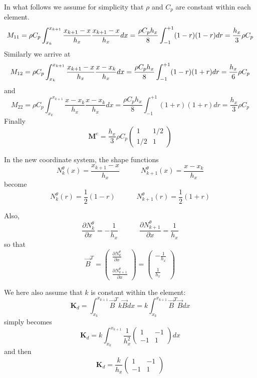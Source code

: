 In what follows we assume for simplicity that $\rho$ and $C_p$ are constant within each element.
\[
M_{11}=
\rho C_p
\int_{\tiny x_k}^{x_{k+1}} 
\frac{x_{k+1}-x}{h_x}  
\frac{x_{k+1}-x}{h_x}  
dx
=  \frac{\rho C_p h_x}{8} \int_{-1}^{+1} (1-r) (1-r)  dr  = \frac{h_x}{3} \rho C_p
\]
Similarly we arrive at 
\begin{eqnarray}
M_{12}
=\rho C_p 
\int_{x_k}^{x_{k+1}} 
\frac{x_{k+1}-x}{h_x}  
\frac{x-x_k}{h_x}  
dx
=
\frac{\rho C_p  h_x}{8} 
\int_{-1}^{+1} (1-r) (1+r)dr
= \frac{h_x}{6} \rho C_p \nonumber
\end{eqnarray}
and 
\[
M_{22}
=
\rho C_p 
\int_{x_k}^{x_{k+1}} 
\frac{x-x_k}{h_x}  
\frac{x-x_k}{h_x}  
dx
=
\frac{\rho C_p  h_x}{8} 
\int_{-1}^{+1} (1+r) (1+r)dr
= \frac{h_x}{3} \rho C_p 
\]
Finally 
\[
\boxed{
{\bm M}^e= \frac{h_x}{3} \rho C_p  
\left(
\begin{array}{cc}
1  & 1/2 \\
1/2 & 1
\end{array}
\right)
}
\]

In the new coordinate system, the {\color{olive}shape functions} 
\[
N_k^\theta(x) = \frac{x_{k+1}-x}{h_x} 
\quad
\quad
\quad
N_{k+1}^\theta(x) = \frac{x-x_k}{h_x} 
\]
become 
\[
N_k^\theta(r) = \frac{1}{2} (1-r)
\quad
\quad
\quad
N_{k+1}^\theta(r) = \frac{1}{2} (1+r)
\]

Also, 
\[
\frac{\partial N_k^\theta}{\partial x} = - \frac{1}{h_x} 
\quad
\quad
\quad
\frac{\partial N_{k+1}^\theta}{\partial x} = \frac{1}{h_x} 
\]
so that 
\[
{\vec B}^T=
\left(
\begin{array}{cc}
 \frac{\partial N_k^\theta}{\partial x}   \\ \\
 \frac{\partial N_{k+1}^\theta}{\partial x}
\end{array}
\right)
=
\left(
\begin{array}{cc}
-\frac{1}{h_x} \\ \\
\frac{1}{h_x} 
\end{array}
\right)
\]


We here also assume that $k$ is constant within the element:
\[
{\bm K}_d =
\int_{x_k}^{x_{k+1}}   {\vec B}^T k {\vec B} dx 
= k \int_{x_k}^{x_{k+1}}   {\vec B}^T {\vec B} dx 
\]
simply becomes
\[
{\bm K}_d = k
 \int_{x_k}^{x_{k+1}} 
\frac{1}{h_x^2}
\left(
\begin{array}{cc}
1 & -1 \\ -1 & 1
\end{array}
\right)
dx
\]
and then
\[
\boxed{
{\bm K}_d =
\frac{k}{h_x}
\left(
\begin{array}{cc}
1 & -1 \\ -1 & 1
\end{array}
\right)
}
\]

